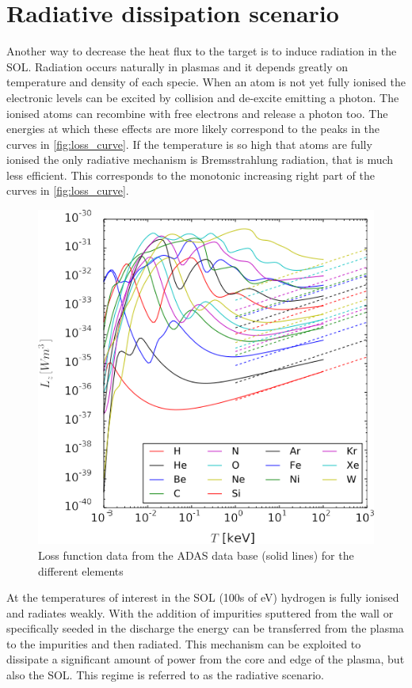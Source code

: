 \section{Radiative dissipation scenario}\label{Radiative dissipation scenario}

Another way to decrease the heat flux to the target is to induce radiation in the SOL.
Radiation occurs naturally in plasmas and it depends greatly on temperature and density of each specie. When an atom is not yet fully ionised the electronic levels can be excited by collision and de-excite emitting a photon. The ionised atoms can recombine with free electrons and release a photon too. The energies at which these effects are more likely correspond to the peaks in the curves in \autoref{fig:loss_curve}. If the temperature is so high that atoms are fully ionised the only radiative mechanism is Bremsstrahlung radiation, that is much less efficient. This corresponds to the monotonic increasing right part of the curves in \autoref{fig:loss_curve}.

\begin{figure}[!ht]
	\centering
	\includegraphics[width=0.7\linewidth]{Chapters/chapter1/figs/loss curve.png}
	\caption{Loss function data from the ADAS data base (solid lines) for the different elements \cite{Lux2015}}
	\label{fig:loss_curve}
\end{figure}

At the temperatures of interest in the SOL (100s of eV\cite{Pacher2011}) hydrogen is fully ionised and radiates weakly. With the addition of impurities sputtered from the wall or specifically seeded in the discharge the energy can be transferred from the plasma to the impurities and then radiated. This mechanism can be exploited to dissipate a significant amount of power from the core and edge of the plasma, but also the SOL. This regime is referred to as the radiative scenario.


